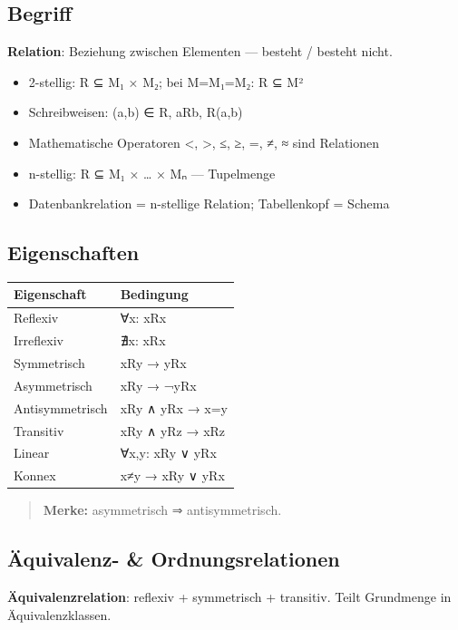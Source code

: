 \documentclass[11pt, a4paper]{article}
\begin{document}
\subsection{Begriff}

\textbf{Relation}: Beziehung zwischen Elementen — besteht / besteht nicht.


\begin{itemize}
  \item 2-stellig: R ⊆ M₁ × M₂; bei M=M₁=M₂: R ⊆ M²
  \item Schreibweisen: (a,b) ∈ R, aRb, R(a,b)
  \item Mathematische Operatoren <, >, ≤, ≥, =, ≠, ≈ sind Relationen
  \item n-stellig: R ⊆ M₁ × … × Mₙ — Tupelmenge
  \item Datenbankrelation = n-stellige Relation; Tabellenkopf = Schema
\end{itemize}


\subsection{Eigenschaften}


{\small
\begin{tabularx}{\linewidth}{XX}
\hline
\rowcolor{tableheadbg}
{\color{white}\textbf{Eigenschaft}} & {\color{white}\textbf{Bedingung}} \\[2pt]
\hline
\endhead
\hline
\endfoot
Reflexiv & ∀x: xRx \\
Irreflexiv & ∄x: xRx \\
Symmetrisch & xRy → yRx \\
Asymmetrisch & xRy → ¬yRx \\
Antisymmetrisch & xRy ∧ yRx → x=y \\
Transitiv & xRy ∧ yRz → xRz \\
Linear & ∀x,y: xRy ∨ yRx \\
Konnex & x≠y → xRy ∨ yRx \\
\end{tabularx}
}


\begin{quote}
\textbf{Merke:} asymmetrisch ⇒ antisymmetrisch.
\end{quote}


\subsection{Äquivalenz- \& Ordnungsrelationen}

\textbf{Äquivalenzrelation}: reflexiv + symmetrisch + transitiv. Teilt Grundmenge in Äquivalenzklassen.
\end{document}
